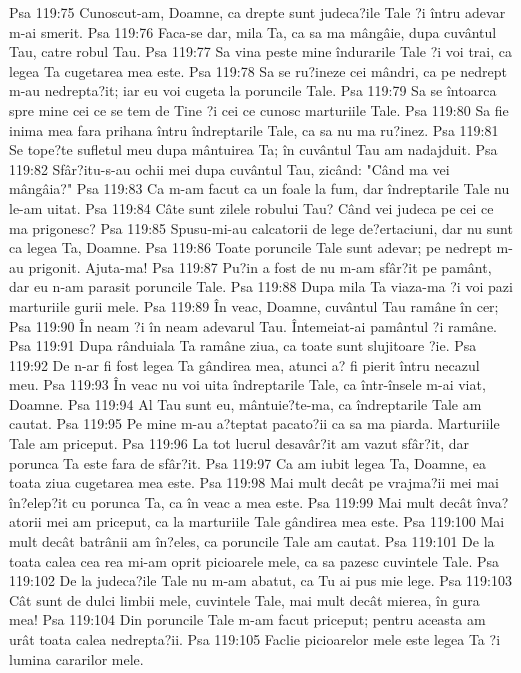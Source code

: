 Psa 119:75  Cunoscut-am, Doamne, ca drepte sunt judeca?ile Tale ?i întru adevar m-ai smerit.
Psa 119:76  Faca-se dar, mila Ta, ca sa ma mângâie, dupa cuvântul Tau, catre robul Tau.
Psa 119:77  Sa vina peste mine îndurarile Tale ?i voi trai, ca legea Ta cugetarea mea este.
Psa 119:78  Sa se ru?ineze cei mândri, ca pe nedrept m-au nedrepta?it; iar eu voi cugeta la poruncile Tale.
Psa 119:79  Sa se întoarca spre mine cei ce se tem de Tine ?i cei ce cunosc marturiile Tale.
Psa 119:80  Sa fie inima mea fara prihana întru îndreptarile Tale, ca sa nu ma ru?inez.
Psa 119:81  Se tope?te sufletul meu dupa mântuirea Ta; în cuvântul Tau am nadajduit.
Psa 119:82  Sfâr?itu-s-au ochii mei dupa cuvântul Tau, zicând: "Când ma vei mângâia?"
Psa 119:83  Ca m-am facut ca un foale la fum, dar îndreptarile Tale nu le-am uitat.
Psa 119:84  Câte sunt zilele robului Tau? Când vei judeca pe cei ce ma prigonesc?
Psa 119:85  Spusu-mi-au calcatorii de lege de?ertaciuni, dar nu sunt ca legea Ta, Doamne.
Psa 119:86  Toate poruncile Tale sunt adevar; pe nedrept m-au prigonit. Ajuta-ma!
Psa 119:87  Pu?in a fost de nu m-am sfâr?it pe pamânt, dar eu n-am parasit poruncile Tale.
Psa 119:88  Dupa mila Ta viaza-ma ?i voi pazi marturiile gurii mele.
Psa 119:89  În veac, Doamne, cuvântul Tau ramâne în cer;
Psa 119:90  În neam ?i în neam adevarul Tau. Întemeiat-ai pamântul ?i ramâne.
Psa 119:91  Dupa rânduiala Ta ramâne ziua, ca toate sunt slujitoare ?ie.
Psa 119:92  De n-ar fi fost legea Ta gândirea mea, atunci a? fi pierit întru necazul meu.
Psa 119:93  În veac nu voi uita îndreptarile Tale, ca într-însele m-ai viat, Doamne.
Psa 119:94  Al Tau sunt eu, mântuie?te-ma, ca îndreptarile Tale am cautat.
Psa 119:95  Pe mine m-au a?teptat pacato?ii ca sa ma piarda. Marturiile Tale am priceput.
Psa 119:96  La tot lucrul desavâr?it am vazut sfâr?it, dar porunca Ta este fara de sfâr?it.
Psa 119:97  Ca am iubit legea Ta, Doamne, ea toata ziua cugetarea mea este.
Psa 119:98  Mai mult decât pe vrajma?ii mei mai în?elep?it cu porunca Ta, ca în veac a mea este.
Psa 119:99  Mai mult decât înva?atorii mei am priceput, ca la marturiile Tale gândirea mea este.
Psa 119:100  Mai mult decât batrânii am în?eles, ca poruncile Tale am cautat.
Psa 119:101  De la toata calea cea rea mi-am oprit picioarele mele, ca sa pazesc cuvintele Tale.
Psa 119:102  De la judeca?ile Tale nu m-am abatut, ca Tu ai pus mie lege.
Psa 119:103  Cât sunt de dulci limbii mele, cuvintele Tale, mai mult decât mierea, în gura mea!
Psa 119:104  Din poruncile Tale m-am facut priceput; pentru aceasta am urât toata calea nedrepta?ii.
Psa 119:105  Faclie picioarelor mele este legea Ta ?i lumina cararilor mele.
